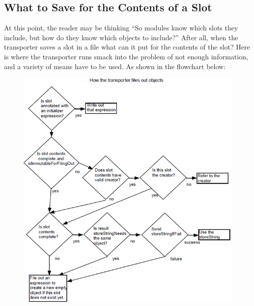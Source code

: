 \documentclass[letterpaper,10pt,english]{sphinxmanual}
\begin{document}
\subsection{What to Save for the Contents of a Slot}
\label{howtoprg:what-to-save-for-the-contents-of-a-slot}
At this point, the reader may be thinking “So modules know which slots they include, but how do
they know which objects to include?” After all, when the transporter saves a slot in a file what can
it put for the contents of the slot? Here is where the transporter runs smack into the problem of not
enough information, and a variety of means have to be used. As shown in the flowchart below:
\begin{figure}[htbp]\begin{flushleft}

\includegraphics{Pgm_Env_Image31.png}
\end{flushleft}\end{figure}
\end{document}
